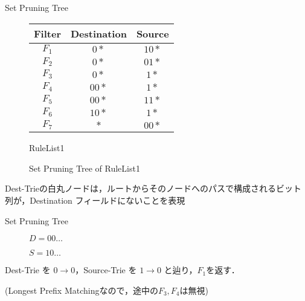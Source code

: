 \documentclass[12pt,dvipdfmx,mathserif,uplatex,aspectratio=32]{beamer}
\makeatletter
\newcommand{\tblcaption}[1]{\def\@captype{table}\caption{#1}}
\makeatother
\begin{document}
\begin{frame}{Set Pruning Tree}

\begin{figure}[h]
 \def\@captype{table}
 \begin{minipage}[t]{.3\textwidth}
  {\scriptsize
  {\centering
  \begin{tabular}{c|c|c} 
   Filter   & Destination & Source \\ \hline
   $F_{1} $ & $0*$        & $10*$   \\ \hline
   $F_{2} $ & $0*$        & $01*$   \\ \hline
   $F_{3} $ & $0*$        & $1*$   \\ \hline
   $F_{4} $ & $00*$       & $1*$   \\ \hline
   $F_{5} $ & $00*$       & $11*$   \\ \hline
   $F_{6} $ & $10*$       & $1*$   \\ \hline
   $F_{7} $ & $*$         & $00*$   
  \end{tabular}
  \tblcaption{RuleList1}

  }
  }
  \end{minipage}
  \hfill
  \begin{minipage}[c]{.6\textwidth}
   \vspace{8mm}
   \scalebox{0.45}{}
   \vspace{-6mm}
   \caption{Set Pruning Tree of RuleList1}
  \end{minipage}
\end{figure}

\vspace{3mm}

Dest-Trieの白丸ノードは，ルートからそのノードへのパスで構成されるビット列が，Destination フィールドにないことを表現

\end{frame}

\begin{frame}{Set Pruning Tree}

\begin{figure}[h]
 \def\@captype{table}
 \begin{minipage}[c]{.55\textwidth}
   \scalebox{0.45}{}
  \end{minipage}
  \hfill
  \begin{minipage}[c]{.3\textwidth}
  $D = 00 \dots$
  \par
  $S = 10 \dots$
  \end{minipage}
\end{figure}

\vspace{5mm}
Dest-Trie を $0 \to 0$，Source-Trie を $1 \to 0$ と辿り，$F_{1}$を返す．
\par
\vspace{3mm}
(Longest Prefix Matchingなので，途中の$F_{3}, F_{4}$は無視)
\end{frame}
\end{document}
